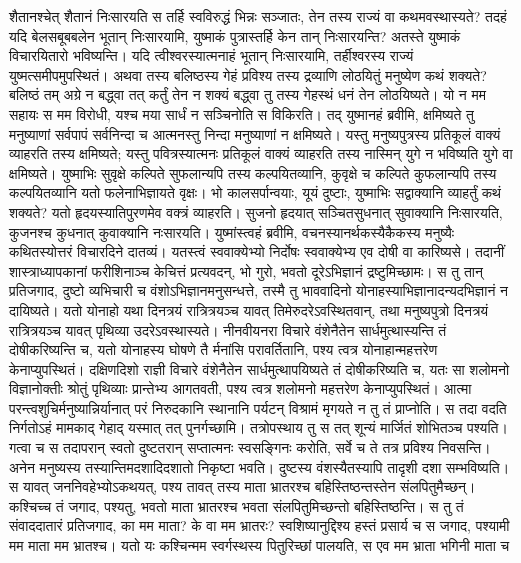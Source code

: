 \vakya शैतानश्चेत् शैतानं निःसारयति स तर्हि स्वविरुद्धं भिन्नः सञ्जातः, तेन तस्य राज्यं वा कथमवस्थास्यते?
\vakya तदहं यदि बेलसबूबबलेन भूतान् निःसारयामि, युष्माकं पुत्रास्तर्हि केन तान् निःसारयन्ति? अतस्ते युष्माकं विचारयितारो भविष्यन्ति।
\vakya यदि त्वीश्वरस्यात्मनाहं भूतान् निःसारयामि, तर्हीश्वरस्य राज्यं युष्मत्समीपमुपस्थितं।
\vakya अथवा तस्य बलिष्ठस्य गेहं प्रविश्य तस्य द्रव्याणि लोठयितुं मनुष्येण कथं शक्यते? बलिष्ठं तम् अग्रे न बद्ध्वा तत् कर्तुं तेन न शक्यं बद्ध्वा तु तस्य गेहस्थं धनं तेन लोठयिष्यते।
\vakya यो न मम सहायः स मम विरोधी, यश्च मया सार्धं न सञ्चिनोति स विकिरति।
\vakya तद् युष्मानहं ब्रवीमि, क्षमिष्यते तु मनुष्याणां सर्वपापं सर्वनिन्दा च आत्मनस्तु निन्दा मनुष्याणां न क्षमिष्यते।
\vakya यस्तु मनुष्यपुत्रस्य प्रतिकूलं वाक्यं व्याहरति तस्य क्षमिष्यते; यस्तु पवित्रस्यात्मनः प्रतिकूलं वाक्यं व्याहरति तस्य नास्मिन् युगे न भविष्यति युगे वा क्षमिष्यते।
\vakya युष्माभिः सुवृक्षे कल्पिते सुफलान्यपि तस्य कल्पयितव्यानि, कुवृक्षे च कल्पिते कुफलान्यपि तस्य कल्पयितव्यानि यतो फलेनाभिज्ञायते वृक्षः।
\vakya भो कालसर्पान्वयाः, यूयं दुष्टाः, युष्माभिः सद्वाक्यानि व्याहर्तुं कथं शक्यते? यतो हृदयस्यातिपुरणमेव वक्त्रं व्याहरति।
\vakya सुजनो हृदयात् सञ्चितसुधनात् सुवाक्यानि निःसारयति, कुजनश्च कुधनात् कुवाक्यानि नःसारयति।
\vakya युष्मांस्त्वहं ब्रवीमि, वचनस्यानर्थकस्यैकैकस्य मनुष्यैः कथितस्योत्तरं विचारदिने दातव्यं।
\vakya यतस्त्वं स्ववाक्येभ्यो निर्दोषः स्ववाक्येभ्य एव दोषी वा कारिष्यसे।
\vakya तदानीं शास्त्राध्यापकानां फरीशिनाञ्च केचित्तं प्रत्यवदन्, भो गुरो, भवतो दूरेऽभिज्ञानं द्रष्टुमिच्छामः।
\vakya स तु तान् प्रतिजगाद, दुष्टो व्यभिचारी च वंशोऽभिज्ञानमनुसन्धत्ते, तस्मै तु भाववादिनो योनाहस्याभिज्ञानादन्यदभिज्ञानं न दायिष्यते।
\vakya यतो योनाहो यथा दिनत्रयं रात्रित्रयञ्च यावत् तिमेरुदरेऽवस्थितवान्, तथा मनुष्यपुत्रो दिनत्रयं रात्रित्रयञ्च यावत् पृथिव्या उदरेऽवस्थास्यते।
\vakya नीनवीयनरा विचारे वंशेनैतेन सार्धमुत्थास्यन्ति तं दोषीकरिष्यन्ति च, यतो योनाहस्य घोषणे तै र्मनांसि परावर्तितानि, पश्य त्वत्र योनाहान्महत्तरेण केनाप्युपस्थितं।
\vakya दक्षिणदिशो राज्ञी विचारे वंशेनैतेन सार्धमुत्थापयिष्यते तं दोषीकरिष्यति च, यतः सा शलोमनो विज्ञानोक्तीः श्रोतुं पृथिव्याः प्रान्तेभ्य आगतवती, पश्य त्वत्र शलोमनो महत्तरेण केनाप्युपस्थितं।
\vakya आत्मा परन्त्वशुचिर्मनुष्यान्निर्यानात् परं निरुदकानि स्थानानि पर्यटन् विश्रामं मृगयते न तु तं प्राप्नोति।
\vakya स तदा वदति निर्गतोऽहं मामकाद् गेहाद् यस्मात् तत् पुनर्गच्छामि। तत्रोपस्थाय तु स तत् शून्यं मार्जितं शोभितञ्च पश्यति।
\vakya गत्वा च स तदापरान् स्वतो दुष्टतरान् सप्तात्मनः स्वसङ्गिनः करोति, सर्वे च ते तत्र प्रविश्य निवसन्ति। अनेन मनुष्यस्य तस्यान्तिमदशादिदशातो निकृष्टा भवति। दुष्टस्य वंशस्यैतस्यापि तादृशी दशा सम्भविष्यति।
\vakya स यावत् जननिवहेभ्योऽकथयत्, पश्य तावत् तस्य माता भ्रातरश्च बहिस्तिष्ठन्तस्तेन संलपितुमैच्छन्।
\vakya कश्चिच्च तं जगाद, पश्यतु, भवतो माता भ्रातरश्च भवता संलपितुमिच्छन्तो बहिस्तिष्ठन्ति।
\vakya स तु तं संवाददातारं प्रतिजगाद, का मम माता? के वा मम भ्रातरः?
\vakya स्वशिष्यानुद्दिश्य हस्तं प्रसार्य च स जगाद, पश्यामी मम माता मम भ्रातश्च।
\vakya यतो यः कश्चिन्मम स्वर्गस्थस्य पितुरिच्छां पालयति, स एव मम भ्राता भगिनी माता च\eoc